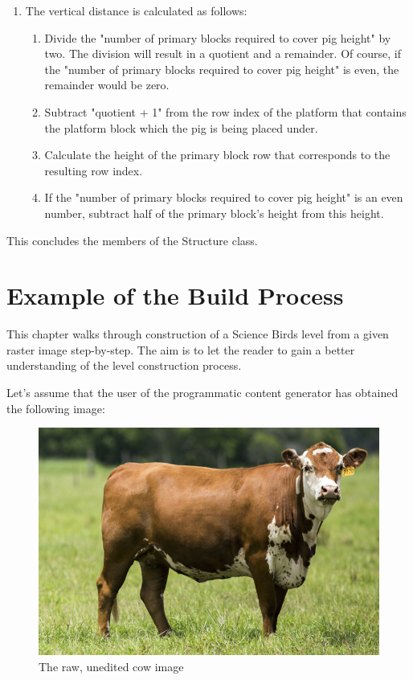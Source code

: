 \documentclass{dalthesis}
\begin{document}
\begin{enumerate}
\begin{enumerate}
\begin{enumerate}
      \item The vertical distance is calculated as follows:

      \begin{enumerate}
        \item Divide the "number of primary blocks required to cover pig height" by two. The division will result in a quotient and a remainder. Of course, if the "number of primary blocks required to cover pig height" is even, the remainder would be zero.

        \item Subtract "quotient + 1" from the row index of the platform that contains the platform block which the pig is being placed under.

        \item Calculate the height of the primary block row that corresponds to the resulting row index.

        \item If the "number of primary blocks required to cover pig height" is an even number, subtract half of the primary block's height from this height.
      \end{enumerate}
    \end{enumerate}
  \end{enumerate}
\end{enumerate}

This concludes the members of the Structure class.

\chapter{Example of the Build Process}\label{sec:tutorial}

This chapter walks through construction of a Science Birds level from a given raster image step-by-step. The aim is to let the reader to gain a better understanding of the level construction process.

Let's assume that the user of the programmatic content generator has obtained the following image:

\begin{figure}[H]
	\caption{The raw, unedited cow image}
  \includegraphics[width=\textwidth,height=\textheight,keepaspectratio]{process/cow-unedited.jpg}
\end{figure}
\end{document}
